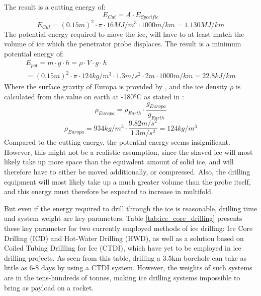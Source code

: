 The result is a cutting energy of:
\begin{equation}
    E_{Cut} = A \cdot E_{Specific}
\end{equation}
\begin{equation}
    E_{Cut} = (0.15m)^2 \cdot \pi \cdot 16MJ/m^3 \cdot 1000m/km = 1.130 MJ/km
\end{equation}
The potential energy required to move the ice, will have to at least match the volume of ice which the penetrator probe displaces.  The result is a minimum potential energy of:
\begin{multline}
E_{pot} = m \cdot g \cdot h = \rho \cdot V \cdot g \cdot h\\
 = (0.15m)^2 \cdot \pi \cdot 124kg/m^3 \cdot 1.3m/s^2 \cdot 2m \cdot 1000m/km = 22.8 kJ/km
\end{multline}
Where the surface gravity of Europa is provided by \cite{wiki_europa}, and the ice density $\rho$ is calculated from the value on earth at -180°C as stated in \cite{wiki_water}:
\begin{equation}
\rho_{Europa} = \rho_{Earth} \cdot \frac{g_{Europa}}{g_{Earth}}
\end{equation}
\begin{equation}
\rho_{Europa} = 934kg/m^3 \cdot \frac{9.82m/s^2}{1.3m/s^2} = 124kg/m^3
\end{equation}
Compared to the cutting energy, the potential energy seems insignificant. However, this might not be a realistic assumption, since the shaved ice will most likely take up more space than the equivalent amount of solid ice, and will therefore have to either be moved additionally, or compressed. Also, the drilling equipment will most likely take up a much greater volume than the probe itself, and this energy must therefore be expected to increase in multifold.

But even if the energy required to drill through the ice is reasonable, drilling time and system weight are key parameters. Table \ref{tab:ice_core_drilling} presents these key parameter for two currently employed methods of ice drilling: Ice Core Drilling (ICD) and Hot-Water Drilling (HWD), as well as a solution based on Coiled Tubing Drillling for Ice (CTDI), which have yet to be employed in ice drilling projects. As seen from this table, drilling a 3.5km borehole can take as little as 6-8 days by using a CTDI system. However, the weights of such systems are in the tens-hundreds of tonnes, making ice drilling systems impossible to bring as payload on a rocket.

